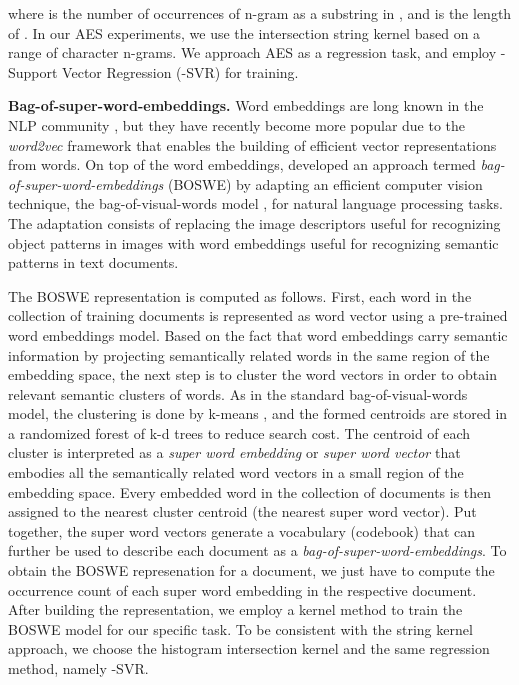 \documentclass[11pt,a4paper]{article}
\begin{document}
where  is the number of occurrences of n-gram  as a substring in , and  is the length of . In our AES experiments, we use the intersection string kernel based on a range of character n-grams. We approach AES as a regression task, and employ -Support Vector Regression (-SVR) \cite{Suykens-NPL-1999,taylor-Cristianini-cup-2004} for training.

\noindent
{\bf Bag-of-super-word-embeddings.}
Word embeddings are long known in the NLP community \cite{Bengio-JMLR-2003,Collobert-ICML-2008}, but they have recently become more popular due to the \emph{word2vec} \cite{Mikolov-NIPS-2013} framework that enables the building of efficient vector representations from words. On top of the word embeddings,  developed an approach termed \emph{bag-of-super-word-embeddings} (BOSWE) by adapting an efficient computer vision technique, the bag-of-visual-words model \cite{Csurka-2004}, for natural language processing tasks. The adaptation consists of replacing the image descriptors \cite{Lowe-SIFT-2004} useful for recognizing object patterns in images with word embeddings \cite{Mikolov-NIPS-2013} useful for recognizing semantic patterns in text documents. 

The BOSWE representation is computed as follows. First, each word in the collection of training documents is represented as word vector using a pre-trained word embeddings model. Based on the fact that word embeddings carry semantic information by projecting semantically related words in the same region of the embedding space, the next step is to cluster the word vectors in order to obtain relevant semantic clusters of words. As in the standard bag-of-visual-words model, the clustering is done by k-means \cite{Leung-2001}, and the formed centroids are stored in a randomized forest of k-d trees \cite{Philbin-2007} to reduce search cost. The centroid of each cluster is interpreted as a \emph{super word embedding} or \emph{super word vector} that embodies all the semantically related word vectors in a small region of the embedding space. Every embedded word in the collection of documents is then assigned to the nearest cluster centroid (the nearest super word vector). Put together, the super word vectors generate a vocabulary (codebook) that can further be used to describe each document as a \emph{bag-of-super-word-embeddings}. To obtain the BOSWE represenation for a document, we just have to compute the occurrence count of each super word embedding in the respective document. After building the representation, we employ a kernel method to train the BOSWE model for our specific task. To be consistent with the string kernel approach, we choose the histogram intersection kernel and the same regression method, namely -SVR.
\end{document}
